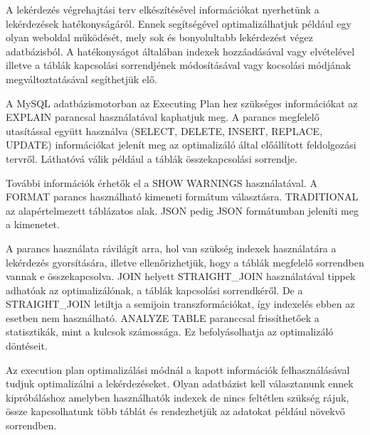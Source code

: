 

A lekérdezés végrehajtási terv elkészítésével információkat nyerhetünk a lekérdezések hatékonyságáról. Ennek segítségével optimalizálhatjuk például egy olyan weboldal működését, mely sok és bonyolultabb lekérdezést végez adatbázisból. A hatékonyságot általában indexek hozzáadásával vagy elvételével illetve a táblák kapcsolási sorrendjének módosításával vagy kocsolási módjának megváltoztatásával segíthetjük elő.


A MySQL adatbázismotorban az Executing Plan hez szükséges információkat az EXPLAIN parancsal használatával kaphatjuk meg.
A parancs megfelelő utasítással együtt használva (SELECT, DELETE, INSERT, REPLACE, UPDATE)  információkat jelenít meg az optimalizáló által előállított feldolgozási tervről. Láthatóvá válik például a táblák összekapcsolási sorrendje.

További információk érhetők el a SHOW WARNINGS használatával.
A FORMAT parancs használható kimeneti formátum választásra. TRADITIONAL az alapértelmezett táblázatos alak. JSON pedig JSON formátumban jeleníti meg a kimenetet.

A parancs használata rávilágít arra, hol van szükség indexek használatára a lekérdezés gyorsítására, illetve ellenőrizhetjük, hogy a táblák megfelelő sorrendben vannak e összekapcsolva. 
JOIN helyett STRAIGHT\_JOIN használatával tippek adhatóak az optimalizálónak, a táblák kapcsolási sorrendkéről. De a STRAIGHT\_JOIN letiltja a semijoin transzformációkat, így indexelés ebben az esetben nem használható.
ANALYZE TABLE paranccsal frissíthetőek a statisztikák, mint a kulcsok számossága. Ez befolyásolhatja az optimalizáló döntéseit. 



Az execution plan optimalizálási módnál a kapott információk felhasználásával tudjuk optimalizálni a lekérdezéseket.
Olyan adatbázist kell választanunk ennek kipróbáláshoz amelyben használhatók indexek de nincs feltétlen szükség rájuk, össze kapcsolhatunk több táblát és rendezhetjük az adatokat például növekvő sorrendben. 

